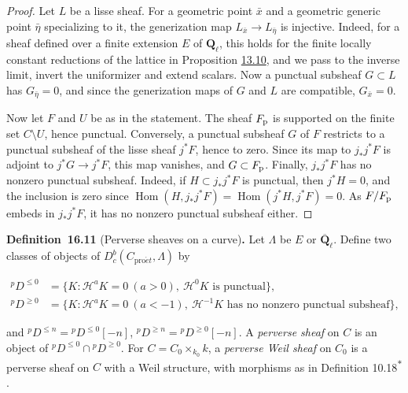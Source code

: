 \documentclass[11pt]{article}
\newenvironment{bpstatement}[2]{\par\addvspace{0.6\baselineskip}\noindent\textbf{#1}#2\textbf{.}\enspace\ignorespaces}
  {\par\addvspace{0.4\baselineskip}}
\newcommand{\bpout}[1]{#1\textsuperscript{\hyperlink{bp-outside}{\ensuremath{\ast}}}}
\providecommand{\Hom}{}\renewcommand{\Hom}{\operatorname{Hom}}
\begin{document}
\begin{proof}[{Proof}]\label{bp200}%
Let \(L\) be a lisse sheaf. For a geometric point \(\bar x\) and a geometric generic point \(\bar\eta\) specializing to it, the generization map \(L_{\bar x}\to L_{\bar\eta}\) is injective. Indeed, for a sheaf defined over a finite extension \(E\) of \(\mathbf Q_\ell\), this holds for the finite locally constant reductions of the lattice in Proposition \hyperref[bp34]{13.10}, and we pass to the inverse limit, invert the uniformizer and extend scalars. Now a punctual subsheaf \(G\subset L\) has \(G_{\bar\eta}=0\), and since the generization maps of \(G\) and \(L\) are compatible, \(G_{\bar x}=0\).

Now let \(F\) and \(U\) be as in the statement. The sheaf \(F_{\rm p}\) is supported on the finite set \(C\setminus U\), hence punctual. Conversely, a punctual subsheaf \(G\) of \(F\) restricts to a punctual subsheaf of the lisse sheaf \(j^*F\), hence to zero. Since its map to \(j_*j^*F\) is adjoint to \(j^*G\to j^*F\), this map vanishes, and \(G\subset F_{\rm p}\). Finally, \(j_*j^*F\) has no nonzero punctual subsheaf. Indeed, if \(H\subset j_*j^*F\) is punctual, then \(j^*H=0\), and the inclusion is zero since \(\Hom(H,j_*j^*F)=\Hom(j^*H,j^*F)=0\). As \(F/F_{\rm p}\) embeds in \(j_*j^*F\), it has no nonzero punctual subsheaf either.
\end{proof}

\label{bp201}%
\begin{bpstatement}{Definition~16.11}{ (Perverse sheaves on a curve)}
Let \(\Lambda\) be \(E\) or \(\overline{\mathbf Q}_\ell\). Define two classes of objects of \(D^b_c(C_{\mathrm{pro}\acute{e}t},\Lambda)\) by

\[
\begin{split}
{}^pD^{\le0}&=\{K:\mathcal H^aK=0\ (a>0),\
\mathcal H^0K\text{ is punctual}\},\\
{}^pD^{\ge0}&=\{K:\mathcal H^aK=0\ (a<-1),\
\mathcal H^{-1}K\text{ has no nonzero punctual subsheaf}\},
\end{split}
\]

and \({}^pD^{\le n}={}^pD^{\le0}[-n]\), \({}^pD^{\ge n}={}^pD^{\ge0}[-n]\). A \emph{perverse sheaf} on \(C\) is an object of \({}^pD^{\le0}\cap{}^pD^{\ge0}\). For \(C=C_0\times_{k_0}k\), a \emph{perverse Weil sheaf} on \(C_0\) is a perverse sheaf on \(C\) with a Weil structure, with morphisms as in Definition \bpout{10.18}.
\end{bpstatement}
\end{document}
